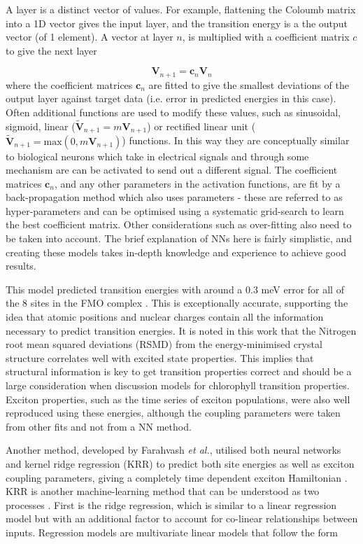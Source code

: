 A layer is a distinct vector of values. For example, flattening the Coloumb matrix
into a 1D vector gives the input layer, and the \Qy transition energy is a the output 
vector (of 1 element). A vector at layer $n$, is multiplied with a coefficient matrix 
$c$ to give the next layer

\begin{equation}
	\mathbf{V}_{n+1} = \mathbf{c}_n \mathbf{V}_n	
\end{equation}
%
where the coefficient matrices $\mathbf{c}_n$ are fitted to give the smallest deviations
of the output layer against target data (i.e. error in predicted \Qy energies in 
this case). Often additional functions are used to modify these values, such as 
sinusoidal, sigmoid, linear ($\tilde{\mathbf{V}}_{n+1}=m \mathbf{V}_{n+1}$) or rectified
linear unit ($\tilde{\mathbf{V}}_{n+1}=\text{max}\left(0, m \mathbf{V}_{n+1} \right)$)
functions. In this way they are conceptually similar to biological neurons which 
take in electrical signals and through some mechanism are can be activated to send 
out a different signal. The coefficient matrices $\mathbf{c}_n$, and any other parameters 
in the activation functions, are fit by a back-propagation method which also uses
parameters - these are referred to as hyper-parameters and can be optimised using 
a systematic grid-search to learn the best coefficient matrix. Other considerations 
such as over-fitting also need to be taken into account. The brief explanation of 
NNs here is fairly simplistic, and creating these models takes in-depth knowledge 
and experience to achieve good results.

This model predicted \Qy transition energies with around a 0.3 meV error for all
of the 8 sites in the FMO complex \cite{AspuruGuzik2016}. This is exceptionally
accurate, supporting the idea that atomic positions and nuclear charges contain 
all the information necessary to predict transition energies. It is noted in this
work that the Nitrogen root mean squared deviations (RSMD) from the energy-minimised
crystal structure correlates well with excited state properties. This implies that
structural information is key to get transition properties correct and should be
a large consideration when discussion models for chlorophyll transition properties.
Exciton properties, such as the time series of exciton populations, were also well 
reproduced using these \Qy energies, although the coupling parameters were taken 
from other fits and not from a NN method.

Another method, developed by Farahvash \emph{et al.}, utilised both neural networks
and kernel ridge regression (KRR) to predict both site energies as well as exciton 
coupling parameters, giving a completely time dependent exciton Hamiltonian \cite{Farahvash2020}. 
KRR is another machine-learning method that can be understood as two processes \cite{Hastie2009}. 
First is the ridge regression, which is similar to a linear regression model but 
with an additional factor to account for co-linear relationships between inputs.
Regression models are multivariate linear models that follow the form

